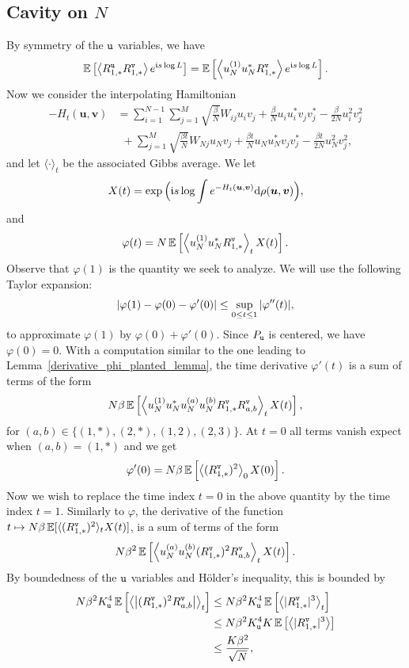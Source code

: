 \documentclass[final,12pt]{colt2018} %
\newcommand{\utt}{\textup{\texttt{u}}}
\newcommand{\vtt}{\textup{\texttt{v}}}
\renewcommand{\u}{\bm{u}}
\renewcommand{\v}{\bm{v}}
\begin{document}
\subsection{Cavity on $N$} 
By symmetry of the $\utt$ variables, we have
\[\E\left[\left\langle R^{\utt}_{1,*}R^{\vtt}_{1,*}\right\rangle e^{\imnb s \log L}\right] = \E\left[\left\langle u_N^{(1)}u_N^{*} R^{\vtt}_{1,*}\right\rangle e^{\imnb s \log L}\right].\]
Now we consider the interpolating Hamiltonian
\begin{align*}
-H_t(\u,\v) &=  \sum_{i=1}^{N-1} \sum_{j=1}^{M} \sqrt{\frac{\beta}{N}}W_{ij}u_i v_j + \frac{\beta}{N}u_iu_i^*v_jv_j^*- \frac{\beta}{2N}u_i^2v_j^2 \\
&~~+  \sum_{j=1}^M \sqrt{\frac{\beta t}{N}}W_{Nj}u_N v_j + \frac{\beta t}{N}u_Nu_N^*v_jv_j^* - \frac{\beta t}{2N}u_N^2v_j^2,
\end{align*}
and let $\langle \cdot \rangle_t$ be the associated Gibbs average. We let 
\[X(t) = \exp\Big(\imnb s \log \int e^{-H_t(\u,\v)} \rmd \rho(\u,\v)\Big), \]
and
\[\varphi(t) = N\E\left[\left\langle u_N^{(1)}u_N^{*} R^{\vtt}_{1,*}\right\rangle_t X(t)\right].\]
Observe that $\varphi(1)$ is the quantity we seek to analyze. We will use the following Taylor expansion:
\[\left|\varphi(1) - \varphi(0) - \varphi'(0)\right| \le \sup_{0\le t\le 1} |\varphi''(t)|,\]
to approximate $\varphi(1)$ by $\varphi(0) + \varphi'(0)$. Since $P_{\utt}$ is centered, we have $\varphi(0) = 0$. With a computation similar to the one leading to Lemma~\ref{derivative_phi_planted_lemma}, the time derivative $\varphi'(t)$ is a sum of terms of the form 
\[N\beta \E\left[\left\langle u_N^{(1)}u_N^{*}u_N^{(a)}u_N^{(b)} R^{\vtt}_{1,*}R^{\vtt}_{a,b}\right\rangle_t X(t)\right],\]
for $(a,b) \in \{(1,*),(2,*),(1,2),(2,3)\}$. At $t=0$ all terms vanish expect when $(a,b)=(1,*)$ and we get
\[\varphi'(0) = N\beta \E\left[\left\langle (R^{\vtt}_{1,*})^2\right\rangle_0 X(0)\right].\]
Now we wish to replace the time index $t=0$ in the above quantity by the time index $t=1$. Similarly to $\varphi$, the derivative of the function $t \mapsto N\beta \E[\langle (R^{\vtt}_{1,*})^2\rangle_t X(t)]$, is a sum of terms of the form
\[N\beta^2 \E\left[\left\langle u_N^{(a)}u_N^{(b)} (R^{\vtt}_{1,*})^2R^{\vtt}_{a,b}\right\rangle_t X(t)\right].\]
By boundedness of the $\utt$ variables and H\"older's inequality, this is bounded by
\begin{align*}
N\beta^2  K_{\utt}^4 \E\left[\left\langle \abs{(R^{\vtt}_{1,*})^2R^{\vtt}_{a,b}}\right\rangle_t\right]
&\le N\beta^2 K_{\utt}^4 \E\left[\left\langle |R^{\vtt}_{1,*}|^{3}\right\rangle_t\right]\\
&\le N\beta^2 K_{\utt}^4K \E\left[\left\langle |R^{\vtt}_{1,*}|^{3}\right\rangle\right]\\
&\le \frac{K\beta^2}{\sqrt{N}},
\end{align*}
\end{document}
